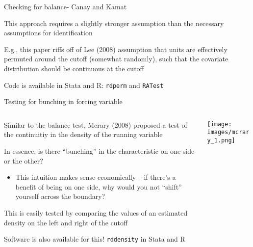 \documentclass[notes,11pt, aspectratio=169]{beamer}
\newenvironment{wideitemize}{\itemize\addtolength{\itemsep}{10pt}}{\enditemize}
\begin{document}
\begin{frame}{Checking for balance- Canay and Kamat}
  \begin{wideitemize}
  \item This approach requires a slightly stronger assumption than the
    necessary assumptions for identification
  \item E.g., this paper riffs off of Lee (2008) assumption that units
    are effectively permuted around the cutoff (somewhat randomly),
    such that the covariate distribution should be continuous at the
    cutoff
  \item Code is available in Stata and R: \texttt{rdperm} and
    \texttt{RATest}
  \end{wideitemize}
\end{frame}




\begin{frame}{Testing for bunching in forcing variable}
    \begin{columns}[onlytextwidth, T] %
      \begin{column}{.5\textwidth}
        \begin{wideitemize}
        \item Similar to the balance test, Mcrary (2008) proposed a
          test of the continuitiy in the density of the running
          variable
        \item In essence, is there ``bunching'' in the characteristic
          on one side or the other?
          \begin{itemize}
          \item This intuition makes sense economically -- if there's
            a benefit of being on one side, why would you not
            ``shift'' yourself across the boundary?
          \end{itemize}
        \item This is easily tested by comparing the values of an
          estimated density on the left and right of the cutoff
        \item Software is also available for this! \texttt{rddensity}
          in Stata and R
        \end{wideitemize}
      \end{column}%
      \hfill%
      \begin{column}{.5\textwidth}
      \texttt{[image: images/mcrary\_1.png]}
      \end{column}%
    \end{columns}
\end{frame}
\end{document}
